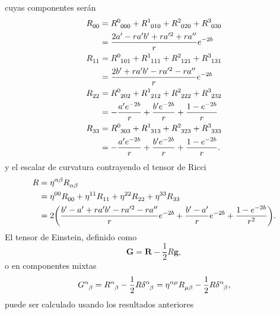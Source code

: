cuyas componentes serán
\begin{subequations}
\begin{align}
    \tensor{R}{_0_0}&=\tensor{R}{^0_0_0_0} + \tensor{R}{^1_0_1_0} + \tensor{R}{^2_0_2_0} + \tensor{R}{^3_0_3_0} \nonumber \\
    &= \frac{2a^\prime-r a^\prime b^\prime +r a^{\prime 2}+r a^{\prime\prime}}{r}e^{-2b} \\
    \tensor{R}{_1_1}&=\tensor{R}{^0_1_0_1} + \tensor{R}{^1_1_1_1} + \tensor{R}{^2_1_2_1} + \tensor{R}{^3_1_3_1} \nonumber \\
    &=\frac{2b^\prime+r a^\prime b^\prime -r a^{\prime 2}-r a^{\prime\prime}}{r}e^{-2b} \\
    \tensor{R}{_2_2}&=\tensor{R}{^0_2_0_2} + \tensor{R}{^1_2_1_2} + \tensor{R}{^2_2_2_2} + \tensor{R}{^3_2_3_2} \nonumber \\
    &= -\frac{a^\prime e^{-2b}}{r}+\frac{b^\prime e^{-2b}}{r}+\frac{1-e^{-2b}}{r} \\
    \tensor{R}{_3_3}&=\tensor{R}{^0_3_0_3} + \tensor{R}{^1_3_1_3} + \tensor{R}{^2_3_2_3} + \tensor{R}{^3_3_3_3} \nonumber \\
    &= -\frac{a^\prime e^{-2b}}{r}+\frac{b^\prime e^{-2b}}{r}+\frac{1-e^{-2b}}{r}.
\end{align}
\end{subequations}
y el escalar de curvatura contrayendo el tensor de Ricci
\begin{align}
    R&=\tensor{\eta}{^\alpha^\beta} \tensor{R}{_\alpha_\beta} \nonumber \\
    &= \tensor{\eta}{^0^0} \tensor{R}{_0_0} + \tensor{\eta}{^1^1} \tensor{R}{_1_1} + \tensor{\eta}{^2^2} \tensor{R}{_2_2} + \tensor{\eta}{^3^3} \tensor{R}{_3_3} \nonumber \\
    &= 2\qty(\frac{b^\prime-a^\prime+r a^\prime b^\prime -r a^{\prime 2}-r a^{\prime\prime}}{r}e^{-2b}+\frac{b^\prime-a^\prime}{r}e^{-2b}+\frac{1-e^{-2b}}{r^2}).
\end{align}
El tensor de Einstein, definido como
\begin{equation}
    \bm{G}=\bm{R}-\frac{1}{2}R\bm{g},
\end{equation}
o en componentes mixtas
\begin{equation}
    \tensor{G}{^\alpha_\beta}=\tensor{R}{^\alpha_\beta}-\frac{1}{2}R\tensor{\delta}{^\alpha_\beta}=\tensor{\eta}{^\alpha^\mu}\tensor{R}{_\mu_\beta}-\frac{1}{2}R\tensor{\delta}{^\alpha_\beta},
\end{equation}
puede ser calculado usando los resultados anteriores

